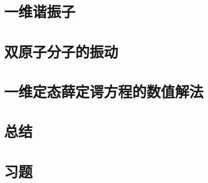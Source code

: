 \section{一维谐振子}
\label{sec:4.2 The}

\section{双原子分子的振动}
\label{sec:4.3 Vibrations of Diatomic Molecules}

\section{一维定态薛定谔方程的数值解法}
\label{sec:4.4 Numerical Solutions of the One-Dimensional Time-Independent Schrödinger Equation}

\section*{总结}

\section*{习题}
